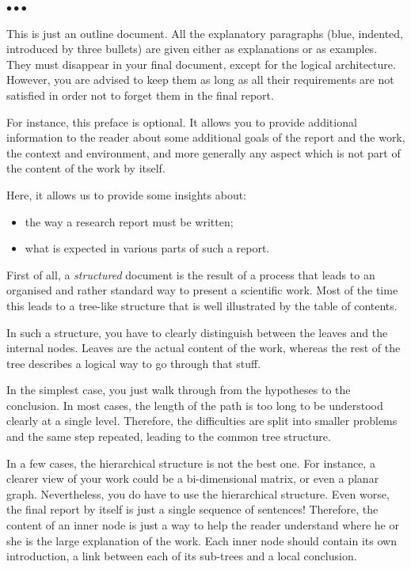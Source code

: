 \documentclass[11pt, english, screen, research-development]{report-rd-info}
\newenvironment{explanation}
{\color{blue}
 \begin{list}{}{\hspace{0.2\textwidth}\color{blue}}\item $\bullet\bullet\bullet$
}
{\end{list}}
\begin{document}
\begin{explanation}
   This is just an outline document.
   All the explanatory paragraphs (blue, indented, introduced by three bullets) are given either as explanations or as examples.
   They must disappear in your final document, except for the logical architecture.
   However, you are advised to keep them as long as all their requirements are not satisfied in order not to forget them in the final report.

   \bigskip

   For instance, this preface is optional.
   It allows you to provide additional information to the reader about some additional goals of the report and the work, the context and environment, and more generally any aspect which is not part of the content of the work by itself.

   Here, it allows us to provide some insights about:
   \begin{itemize}
      \item the way a research report must be written;
      \item what is expected in various parts of such a report.
   \end{itemize}

   \bigskip

   First of all, a \emph{structured} document is the result of a process that leads to an organised and rather standard way to present a scientific work.
   Most of the time this leads to a tree-like structure that is well illustrated by the table of contents.

   In such a structure, you have to clearly distinguish between the leaves and the internal nodes.
   Leaves are the actual content of the work, whereas the rest of the tree describes a logical way to go through that stuff.

   In the simplest case, you just walk through from the hypotheses to the conclusion.
   In most cases, the length of the path is too long to be understood clearly at a single level.
   Therefore, the difficulties are split into smaller problems and the same step repeated, leading to the common tree structure.

   In a few cases, the hierarchical structure is not the best one.
   For instance, a clearer view of your work could be a bi-dimensional matrix, or even a planar graph.
   Nevertheless, you do have to use the hierarchical structure.
   Even worse, the final report by itself is just a single sequence of sentences!  Therefore, the content of an inner node is just a way to help the reader understand where he or she is the large explanation of the work.
   Each inner node should contain its own introduction, a link between each of its sub-trees and a local conclusion.


\end{explanation}
\end{document}
